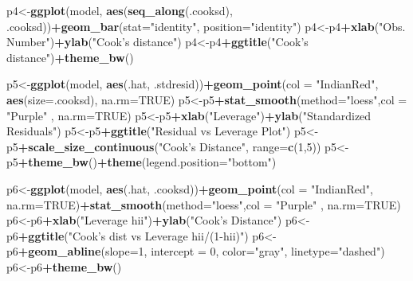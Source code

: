 \documentclass[12pt]{article}
\newenvironment{Shaded}{\begin{snugshade}}{\end{snugshade}}
\newcommand{\DataTypeTok}[1]{\textcolor[rgb]{0.13,0.29,0.53}{#1}}
\newcommand{\DecValTok}[1]{\textcolor[rgb]{0.00,0.00,0.81}{#1}}
\newcommand{\KeywordTok}[1]{\textcolor[rgb]{0.13,0.29,0.53}{\textbf{#1}}}
\newcommand{\NormalTok}[1]{#1}
\newcommand{\OperatorTok}[1]{\textcolor[rgb]{0.81,0.36,0.00}{\textbf{#1}}}
\newcommand{\OtherTok}[1]{\textcolor[rgb]{0.56,0.35,0.01}{#1}}
\newcommand{\StringTok}[1]{\textcolor[rgb]{0.31,0.60,0.02}{#1}}
\begin{document}
\begin{Shaded}
\begin{Highlighting}[]
\NormalTok{    p4<-}\KeywordTok{ggplot}\NormalTok{(model, }\KeywordTok{aes}\NormalTok{(}\KeywordTok{seq_along}\NormalTok{(.cooksd), .cooksd))}\OperatorTok{+}\KeywordTok{geom_bar}\NormalTok{(}\DataTypeTok{stat=}\StringTok{"identity"}\NormalTok{, }\DataTypeTok{position=}\StringTok{"identity"}\NormalTok{)}
\NormalTok{    p4<-p4}\OperatorTok{+}\KeywordTok{xlab}\NormalTok{(}\StringTok{"Obs. Number"}\NormalTok{)}\OperatorTok{+}\KeywordTok{ylab}\NormalTok{(}\StringTok{"Cook's distance"}\NormalTok{)}
\NormalTok{    p4<-p4}\OperatorTok{+}\KeywordTok{ggtitle}\NormalTok{(}\StringTok{"Cook's distance"}\NormalTok{)}\OperatorTok{+}\KeywordTok{theme_bw}\NormalTok{()}
    
\NormalTok{    p5<-}\KeywordTok{ggplot}\NormalTok{(model, }\KeywordTok{aes}\NormalTok{(.hat, .stdresid))}\OperatorTok{+}\KeywordTok{geom_point}\NormalTok{(}\DataTypeTok{col =} \StringTok{"IndianRed"}\NormalTok{, }\KeywordTok{aes}\NormalTok{(}\DataTypeTok{size=}\NormalTok{.cooksd), }\DataTypeTok{na.rm=}\OtherTok{TRUE}\NormalTok{)}
\NormalTok{    p5<-p5}\OperatorTok{+}\KeywordTok{stat_smooth}\NormalTok{(}\DataTypeTok{method=}\StringTok{"loess"}\NormalTok{,}\DataTypeTok{col =} \StringTok{"Purple"}\NormalTok{ , }\DataTypeTok{na.rm=}\OtherTok{TRUE}\NormalTok{)}
\NormalTok{    p5<-p5}\OperatorTok{+}\KeywordTok{xlab}\NormalTok{(}\StringTok{"Leverage"}\NormalTok{)}\OperatorTok{+}\KeywordTok{ylab}\NormalTok{(}\StringTok{"Standardized Residuals"}\NormalTok{)}
\NormalTok{    p5<-p5}\OperatorTok{+}\KeywordTok{ggtitle}\NormalTok{(}\StringTok{"Residual vs Leverage Plot"}\NormalTok{)}
\NormalTok{    p5<-p5}\OperatorTok{+}\KeywordTok{scale_size_continuous}\NormalTok{(}\StringTok{"Cook's Distance"}\NormalTok{, }\DataTypeTok{range=}\KeywordTok{c}\NormalTok{(}\DecValTok{1}\NormalTok{,}\DecValTok{5}\NormalTok{))}
\NormalTok{    p5<-p5}\OperatorTok{+}\KeywordTok{theme_bw}\NormalTok{()}\OperatorTok{+}\KeywordTok{theme}\NormalTok{(}\DataTypeTok{legend.position=}\StringTok{"bottom"}\NormalTok{)}
    
\NormalTok{    p6<-}\KeywordTok{ggplot}\NormalTok{(model, }\KeywordTok{aes}\NormalTok{(.hat, .cooksd))}\OperatorTok{+}\KeywordTok{geom_point}\NormalTok{(}\DataTypeTok{col =} \StringTok{"IndianRed"}\NormalTok{, }\DataTypeTok{na.rm=}\OtherTok{TRUE}\NormalTok{)}\OperatorTok{+}\KeywordTok{stat_smooth}\NormalTok{(}\DataTypeTok{method=}\StringTok{"loess"}\NormalTok{,}\DataTypeTok{col =} \StringTok{"Purple"}\NormalTok{ , }\DataTypeTok{na.rm=}\OtherTok{TRUE}\NormalTok{)}
\NormalTok{    p6<-p6}\OperatorTok{+}\KeywordTok{xlab}\NormalTok{(}\StringTok{"Leverage hii"}\NormalTok{)}\OperatorTok{+}\KeywordTok{ylab}\NormalTok{(}\StringTok{"Cook's Distance"}\NormalTok{)}
\NormalTok{    p6<-p6}\OperatorTok{+}\KeywordTok{ggtitle}\NormalTok{(}\StringTok{"Cook's dist vs Leverage hii/(1-hii)"}\NormalTok{)}
\NormalTok{    p6<-p6}\OperatorTok{+}\KeywordTok{geom_abline}\NormalTok{(}\DataTypeTok{slope=}\DecValTok{1}\NormalTok{, }\DataTypeTok{intercept =} \DecValTok{0}\NormalTok{, }\DataTypeTok{color=}\StringTok{"gray"}\NormalTok{, }\DataTypeTok{linetype=}\StringTok{"dashed"}\NormalTok{)}
\NormalTok{    p6<-p6}\OperatorTok{+}\KeywordTok{theme_bw}\NormalTok{()}
    

\end{Highlighting}
\end{Shaded}
\end{document}
